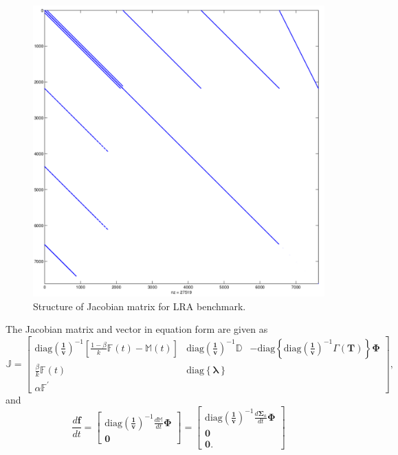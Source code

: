 \documentclass{ansconf}
\numberwithin{equation}{section}
\begin{document}
\begin{figure}
\centering \includegraphics[scale=0.4]{./figs/jacobian.pdf}
\caption{Structure of Jacobian matrix for LRA benchmark.}
\label{fig:jacobian}
\end{figure}
The Jacobian matrix and vector in equation form are given as
\begin{equation} \label{eq:LRA_Jmat}
    \mathbb{J} = \left[ \begin{array}{ccc} 
    \mathrm{diag}\left(\boldsymbol{\frac{1}{v}}\right)^{-1}\left[\frac{1-\beta}{k}\mathbb{F}\left(t\right) - \mathbb{M}\left(t\right)\right] & \mathrm{diag}\left(\boldsymbol{\frac{1}{v}}\right)^{-1}\mathbb{D} & -\mathrm{diag}\left\lbrace\mathrm{diag}\left(\boldsymbol{\frac{1}{v}}\right)^{-1}\Gamma\left(\boldsymbol{T}\right)\right\rbrace\boldsymbol{\Phi}\\
     \frac{\beta}{k}\mathbb{F}\left(t\right) & \mathrm{diag}\left\lbrace\boldsymbol{\lambda}\right\rbrace \\
     \alpha\mathbb{F}^\prime
    \end{array}\right],
\end{equation}
and
\begin{equation}\label{eq:LRA_Jvec}
    \frac{d\mathbf{f}}{dt} = \left[ \begin{array}{c}
    \mathrm{diag}\left(\boldsymbol{\frac{1}{v}}\right)^{-1} \frac{d\mathbb{M}}{dt}\boldsymbol{\Phi} \\ \mathbf{0}
    \end{array}\right] = \left[ \begin{array}{c}
    \mathrm{diag}\left(\boldsymbol{\frac{1}{v}}\right)^{-1} \frac{d\boldsymbol{\Sigma}_a}{dt}\boldsymbol{\Phi} \\ \mathbf{0} \\ \mathbf{0}.
    \end{array}\right]
\end{equation}
\end{document}
